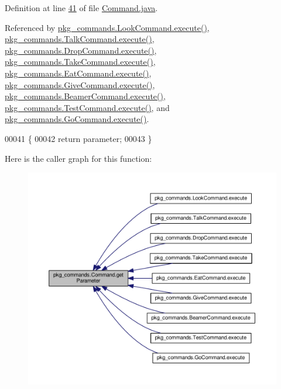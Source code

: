 Definition at line \hyperlink{Command_8java_source_l00041}{41} of file \hyperlink{Command_8java_source}{Command.\-java}.



Referenced by \hyperlink{LookCommand_8java_source_l00026}{pkg\-\_\-commands.\-Look\-Command.\-execute()}, \hyperlink{TalkCommand_8java_source_l00027}{pkg\-\_\-commands.\-Talk\-Command.\-execute()}, \hyperlink{DropCommand_8java_source_l00027}{pkg\-\_\-commands.\-Drop\-Command.\-execute()}, \hyperlink{TakeCommand_8java_source_l00027}{pkg\-\_\-commands.\-Take\-Command.\-execute()}, \hyperlink{EatCommand_8java_source_l00028}{pkg\-\_\-commands.\-Eat\-Command.\-execute()}, \hyperlink{GiveCommand_8java_source_l00029}{pkg\-\_\-commands.\-Give\-Command.\-execute()}, \hyperlink{BeamerCommand_8java_source_l00030}{pkg\-\_\-commands.\-Beamer\-Command.\-execute()}, \hyperlink{TestCommand_8java_source_l00032}{pkg\-\_\-commands.\-Test\-Command.\-execute()}, and \hyperlink{GoCommand_8java_source_l00032}{pkg\-\_\-commands.\-Go\-Command.\-execute()}.


\begin{DoxyCode}
00041                                  \{
00042         \textcolor{keywordflow}{return} parameter;
00043     \}
\end{DoxyCode}


Here is the caller graph for this function\-:
\nopagebreak
\begin{figure}[H]
\begin{center}
\leavevmode
\includegraphics[width=350pt]{classpkg__commands_1_1Command_a41c92d445be73ea9d62320c65efb8434_icgraph}
\end{center}
\end{figure}


